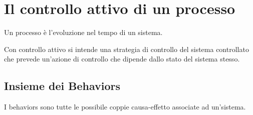\chapter{Il controllo attivo di un processo}

Un processo \`e l'evoluzione nel tempo di un sistema.

Con controllo attivo si intende una strategia di controllo del sistema controllato che prevede 
un'azione di controllo che dipende dallo stato del sistema stesso.

\section{Insieme dei Behaviors}

I behaviors sono tutte le possibile coppie causa-effetto associate ad un'sistema.







